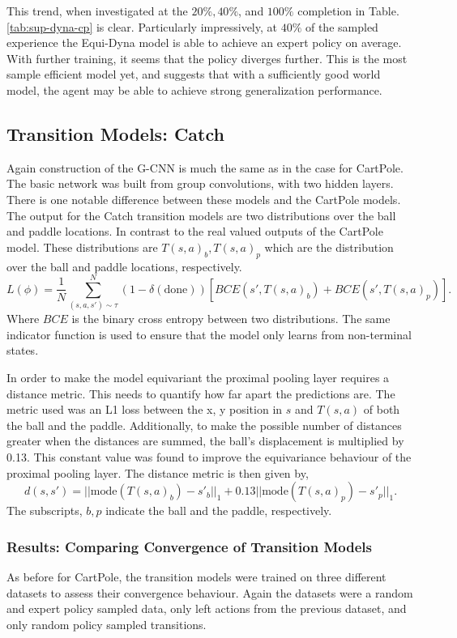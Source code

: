 This trend, when investigated at the $20\%, 40\%$, and $100\%$ completion in Table.\ref{tab:sup-dyna-cp} is clear. Particularly impressively, at $40\%$ of the sampled experience the Equi-Dyna model is able to achieve an expert policy on average. With further training, it seems that the policy diverges further. This is the most sample efficient model yet, and suggests that with a sufficiently good world model, the agent may be able to achieve strong generalization performance.
\subsection{Transition Models: Catch}

Again construction of the G-CNN is much the same as in the case for CartPole. The basic network was built from group convolutions, with two hidden layers. There is one notable difference between these models and the CartPole models. The output for the Catch transition models are two distributions over the ball and paddle locations. In contrast to the real valued outputs of the CartPole model. These distributions are $T(s, a)_b, T(s, a)_p$ which are the distribution over the ball and paddle locations, respectively.
\begin{equation}
	L(\phi) = \frac{1}{N}\sum_{(s, a, s') \sim \tau}^N(1- \delta (\text{done}))\left[BCE(s', T(s, a)_b) + BCE(s', T(s, a)_p)\right] .
\end{equation}
Where $BCE$ is the binary cross entropy between two distributions. The same indicator function is used to ensure that the model only learns from non-terminal states.

In order to make the model equivariant the proximal pooling layer requires  a distance metric. This needs to quantify how far apart the predictions are. The metric used was an L1 loss between the x, y position in $s$ and $T(s,a)$ of both the ball and the paddle. Additionally, to make the possible number of distances greater when the distances are summed, the ball's displacement is multiplied by 0.13. This constant value was found to improve the equivariance behaviour of the proximal pooling layer. The distance metric is then given by,
\begin{equation}
	d(s, s') = ||\text{mode}(T(s, a)_b) - s'_b||_1 + 0.13 ||\text{mode}(T(s, a)_p )- s'_p||_1.
\end{equation}
The subscripts, $b, p$ indicate the ball and the paddle, respectively.

\subsubsection{Results: Comparing Convergence of Transition Models}
As before for CartPole, the transition models were trained on three different datasets to assess their convergence behaviour. Again the datasets were a random and expert policy sampled data, only left actions from the previous dataset, and only random policy sampled transitions.

